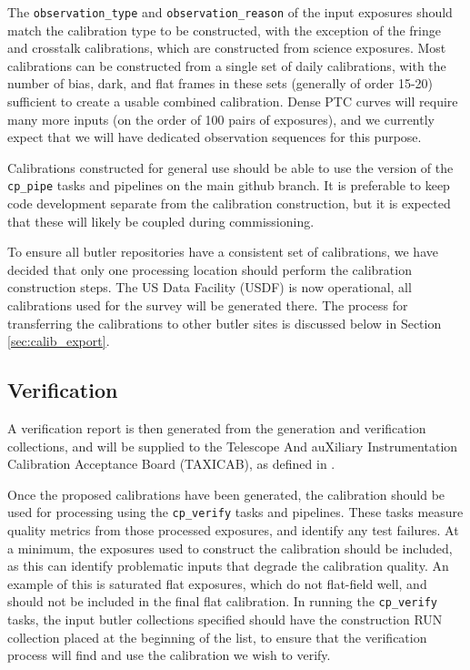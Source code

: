 \documentclass[DM,authoryear,toc]{lsstdoc}
\begin{document}
The \verb|observation_type| and \verb|observation_reason| of the input exposures should match the calibration type to be constructed, with the exception of the fringe and crosstalk calibrations, which are constructed from science exposures.
Most calibrations can be constructed from a single set of daily calibrations, with the number of bias, dark, and flat frames in these sets (generally of order 15-20) sufficient to create a usable combined calibration.
Dense PTC curves will require many more inputs (on the order of 100 pairs of exposures), and we currently expect that we will have dedicated observation sequences for this purpose.

Calibrations constructed for general use should be able to use the version of the \verb|cp_pipe| tasks and pipelines on the main github branch.
It is preferable to keep code development separate from the calibration construction, but it is expected that these will likely be coupled during commissioning.

To ensure all butler repositories have a consistent set of calibrations, we have decided that only one processing location should perform the calibration construction steps.
The US Data Facility (USDF) is now operational, all calibrations used for the survey will be generated there.
The process for transferring the calibrations to other butler sites is discussed below in Section \ref{sec:calib_export}.

\subsection{Verification}
A verification report is then generated from the generation and verification collections, and will be supplied to the Telescope And auXiliary Instrumentation Calibration Acceptance Board (TAXICAB), as defined in .

Once the proposed calibrations have been generated, the calibration should be used for processing using the \verb|cp_verify| tasks and pipelines.
These tasks measure quality metrics from those processed exposures, and identify any test failures.
At a minimum, the exposures used to construct the calibration should be included, as this can identify problematic inputs that degrade the calibration quality.
An example of this is saturated flat exposures, which do not flat-field well, and should not be included in the final flat calibration.
In running the \verb|cp_verify| tasks, the input butler collections specified should have the construction RUN collection placed at the beginning of the list, to ensure that the verification process will find and use the calibration we wish to verify.
\end{document}
